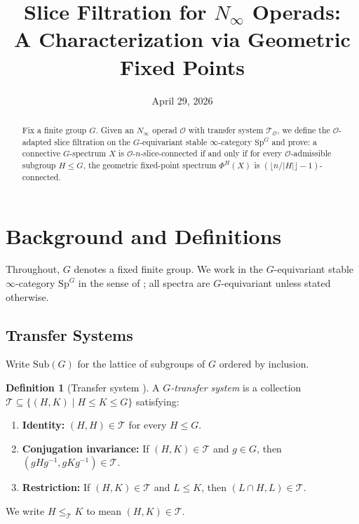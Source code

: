 \documentclass[12pt]{article}
\title{Slice Filtration for $N_\infty$ Operads:\\
       A Characterization via Geometric Fixed Points}
\author{}
\date{April 29, 2026}
\theoremstyle{definition}
\newtheorem{definition}[theorem]{Definition}
\newcommand{\calO}{\mathcal{O}}
\newcommand{\SpG}{\mathrm{Sp}^G}
\newcommand{\Sub}{\mathrm{Sub}}
\newcommand{\floor}[1]{\lfloor #1 \rfloor}
\begin{document}
\maketitle

\begin{abstract}
Fix a finite group $G$. Given an $N_\infty$ operad $\calO$ with transfer system
$\mathcal{T}_\calO$, we define the $\calO$-adapted slice filtration on the $G$-equivariant
stable $\infty$-category $\SpG$ and prove: a connective $G$-spectrum $X$ is
$\calO$-$n$-slice-connected if and only if for every $\calO$-admissible subgroup $H \leq G$,
the geometric fixed-point spectrum $\Phi^H(X)$ is $(\floor{n/|H|} - 1)$-connected.
\end{abstract}

\tableofcontents

\section{Background and Definitions}

Throughout, $G$ denotes a fixed finite group. We work in the $G$-equivariant stable
$\infty$-category $\SpG$ in the sense of \cite{HHR2016,LMS1986}; all spectra are
$G$-equivariant unless stated otherwise.

\subsection{Transfer Systems}

Write $\Sub(G)$ for the lattice of subgroups of $G$ ordered by inclusion.

\begin{definition}[Transfer system {\cite{BlumbergHill2015}}]
\label{def:transfer-system}
A \emph{$G$-transfer system} is a collection
$\mathcal{T} \subseteq \{(H, K) \mid H \leq K \leq G\}$
satisfying:
\begin{enumerate}
\item[(T1)] \textbf{Identity:} $(H, H) \in \mathcal{T}$ for every $H \leq G$.
\item[(T2)] \textbf{Conjugation invariance:} If $(H, K) \in \mathcal{T}$ and $g \in G$,
  then $(gHg^{-1}, gKg^{-1}) \in \mathcal{T}$.
\item[(T3)] \textbf{Restriction:} If $(H, K) \in \mathcal{T}$ and $L \leq K$, then
  $(L \cap H, L) \in \mathcal{T}$.
\end{enumerate}
We write $H \leq_{\mathcal{T}} K$ to mean $(H,K) \in \mathcal{T}$.
\end{definition}
\end{document}
